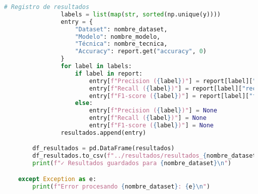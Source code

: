 \begin{lstlisting}[language=Python, caption={Script de experimentación automática}, label={lst:script_experimento}]
                # Registro de resultados
                labels = list(map(str, sorted(np.unique(y))))
                entry = {
                    "Dataset": nombre_dataset,
                    "Modelo": nombre_modelo,
                    "Técnica": nombre_tecnica,
                    "Accuracy": report.get("accuracy", 0)
                }
                for label in labels:
                    if label in report:
                        entry[f"Precision ({label})"] = report[label]["precision"]
                        entry[f"Recall ({label})"] = report[label]["recall"]
                        entry[f"F1-score ({label})"] = report[label]["f1-score"]
                    else:
                        entry[f"Precision ({label})"] = None
                        entry[f"Recall ({label})"] = None
                        entry[f"F1-score ({label})"] = None
                resultados.append(entry)

        df_resultados = pd.DataFrame(resultados)
        df_resultados.to_csv(f"../resultados/resultados_{nombre_dataset}.csv", index=False)
        print(f"✓ Resultados guardados para {nombre_dataset}\n")

    except Exception as e:
        print(f"Error procesando {nombre_dataset}: {e}\n")
\end{lstlisting}
